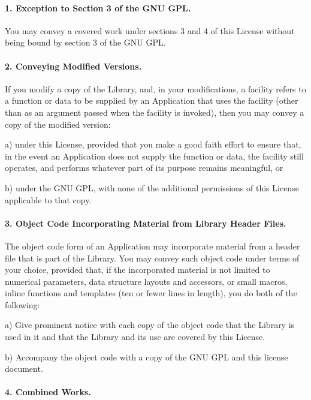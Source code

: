 \paragraph*{1. Exception to Section 3 of the G\-N\-U G\-P\-L.}

You may convey a covered work under sections 3 and 4 of this License without being bound by section 3 of the G\-N\-U G\-P\-L.

\paragraph*{2. Conveying Modified Versions.}

If you modify a copy of the Library, and, in your modifications, a facility refers to a function or data to be supplied by an Application that uses the facility (other than as an argument passed when the facility is invoked), then you may convey a copy of the modified version\-:

a) under this License, provided that you make a good faith effort to ensure that, in the event an Application does not supply the function or data, the facility still operates, and performs whatever part of its purpose remains meaningful, or

b) under the G\-N\-U G\-P\-L, with none of the additional permissions of this License applicable to that copy.

\paragraph*{3. Object Code Incorporating Material from Library Header Files.}

The object code form of an Application may incorporate material from a header file that is part of the Library. You may convey such object code under terms of your choice, provided that, if the incorporated material is not limited to numerical parameters, data structure layouts and accessors, or small macros, inline functions and templates (ten or fewer lines in length), you do both of the following\-:

a) Give prominent notice with each copy of the object code that the Library is used in it and that the Library and its use are covered by this License.

b) Accompany the object code with a copy of the G\-N\-U G\-P\-L and this license document.

\paragraph*{4. Combined Works.}

